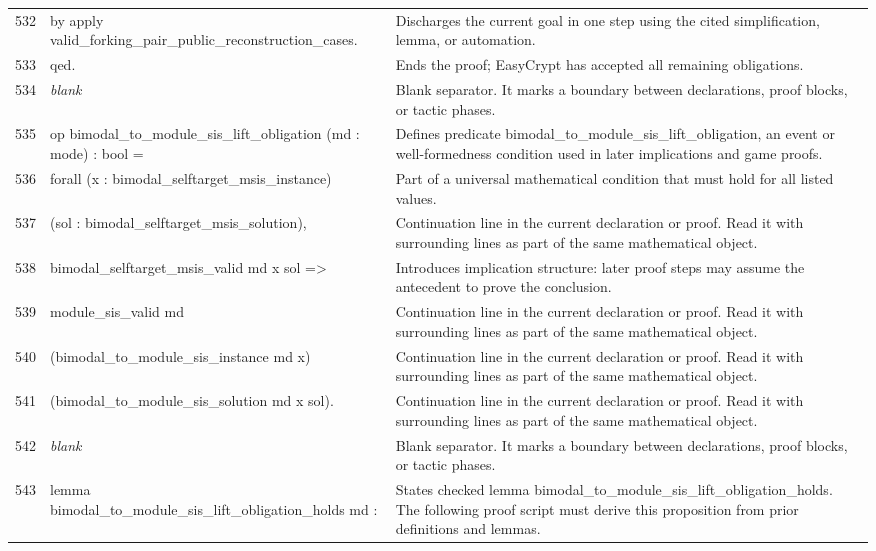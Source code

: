 \documentclass[10pt]{article}
\begin{document}
\begin{longtable}{r L{0.53\textwidth} L{0.37\textwidth}}
532 & {\ttfamily\scriptsize by apply valid\_forking\_pair\_public\_reconstruction\_cases.} & Discharges the current goal in one step using the cited simplification, lemma, or automation. \\
533 & {\ttfamily\scriptsize qed.} & Ends the proof; EasyCrypt has accepted all remaining obligations. \\
534 & {\ttfamily\scriptsize \emph{blank}} & Blank separator.  It marks a boundary between declarations, proof blocks, or tactic phases. \\
535 & {\ttfamily\scriptsize op bimodal\_to\_module\_sis\_lift\_obligation (md : mode) : bool =} & Defines predicate bimodal\_to\_module\_sis\_lift\_obligation, an event or well-formedness condition used in later implications and game proofs. \\
536 & {\ttfamily\scriptsize   forall (x : bimodal\_selftarget\_msis\_instance)} & Part of a universal mathematical condition that must hold for all listed values. \\
537 & {\ttfamily\scriptsize          (sol : bimodal\_selftarget\_msis\_solution),} & Continuation line in the current declaration or proof.  Read it with surrounding lines as part of the same mathematical object. \\
538 & {\ttfamily\scriptsize     bimodal\_selftarget\_msis\_valid md x sol =>} & Introduces implication structure: later proof steps may assume the antecedent to prove the conclusion. \\
539 & {\ttfamily\scriptsize     module\_sis\_valid md} & Continuation line in the current declaration or proof.  Read it with surrounding lines as part of the same mathematical object. \\
540 & {\ttfamily\scriptsize       (bimodal\_to\_module\_sis\_instance md x)} & Continuation line in the current declaration or proof.  Read it with surrounding lines as part of the same mathematical object. \\
541 & {\ttfamily\scriptsize       (bimodal\_to\_module\_sis\_solution md x sol).} & Continuation line in the current declaration or proof.  Read it with surrounding lines as part of the same mathematical object. \\
542 & {\ttfamily\scriptsize \emph{blank}} & Blank separator.  It marks a boundary between declarations, proof blocks, or tactic phases. \\
543 & {\ttfamily\scriptsize lemma bimodal\_to\_module\_sis\_lift\_obligation\_holds md :} & States checked lemma bimodal\_to\_module\_sis\_lift\_obligation\_holds.  The following proof script must derive this proposition from prior definitions and lemmas. \\

\end{longtable}
\end{document}
